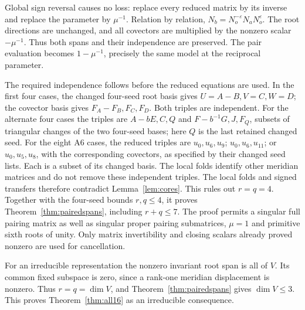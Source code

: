 \documentclass[11pt]{article}
\begin{document}
Global sign reversal causes no loss: replace every reduced matrix by
its inverse and replace the parameter by $\mu^{-1}$.
Relation by relation, $N_b=N_o^{-\varepsilon}N_aN_o^{\varepsilon}$.
The root directions are unchanged, and all covectors are multiplied
by the nonzero scalar $-\mu^{-1}$. Thus both spans and their
independence are preserved. The pair evaluation becomes
$1-\mu^{-1}$, precisely the same model at the reciprocal parameter.

The required independence follows before the reduced equations are
used. In the first four cases, the changed four-seed root basis gives
$U=A-B,V=C,W=D$; the covector basis gives $F_A-F_B,F_C,F_D$.
Both triples are independent. For the alternate four cases the triples
are $A-bE,C,Q$ and $F-b^{-1}G,J,F_Q$, subsets of triangular changes
of the two four-seed bases; here $Q$ is the last retained changed seed.
For the eight A6 cases, the reduced triples are $u_0,u_6,u_9$;
$u_0,u_6,u_{11}$; or $u_0,u_5,u_8$, with the corresponding covectors,
as specified by their changed seed lists. Each is a subset of its
changed basis. The local folds identify other meridian matrices and
do not remove these independent triples.
The local folds and signed transfers therefore contradict
Lemma~\ref{lem:cores}. This rules out $r=q=4$. Together with the
four-seed bounds $r,q\le4$, it proves
Theorem~\ref{thm:pairedspans}, including $r+q\le7$.
The proof permits a singular full pairing matrix as well as singular
proper pairing submatrices, $\mu=1$ and
primitive sixth roots of unity. Only matrix invertibility and closing
scalars already proved nonzero are used for cancellation.

For an irreducible representation the nonzero invariant root span is
all of $V$. Its common fixed subspace is zero, since a rank-one
meridian displacement is nonzero. Thus $r=q=\dim V$, and
Theorem~\ref{thm:pairedspans} gives $\dim V\le3$. This proves
Theorem~\ref{thm:all16} as an irreducible consequence.
\end{document}
